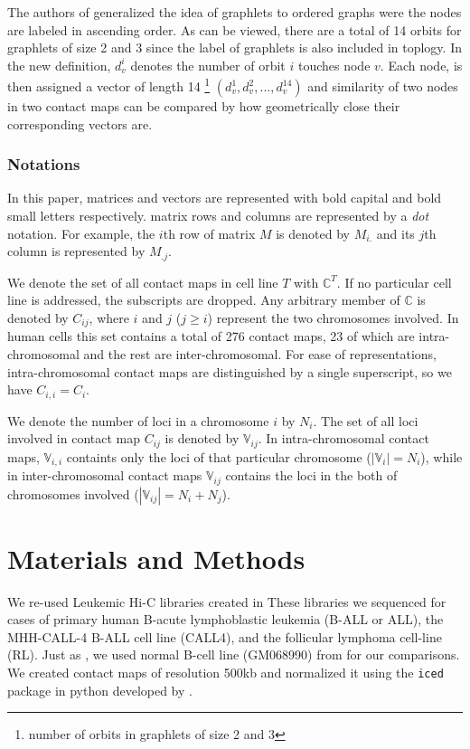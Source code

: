 \documentclass[a4,center,fleqn]{NAR}
\begin{document}
The authors of \cite{di2010fast} generalized the idea of graphlets to 
ordered graphs were the nodes are labeled in ascending order.
As can be viewed, there are a total of 14 orbits for graphlets of size
2 and 3 since the label of graphlets is also included in toplogy.
In the new definition, $d_v^i$ denotes the number of orbit $i$ touches 
node $v$. Each node, is then assigned a vector of length 14 
\footnote{number of orbits in graphlets of size 2 and 3}
$(d_v^1, d_v^2, ..., d_v^{14})$ 
and similarity of two nodes in two contact maps can be compared by
how geometrically close their corresponding vectors are.

\subsubsection{Notations}
In this paper, matrices and vectors are represented with bold
capital and bold small letters respectively.
matrix rows and columns are represented by a \textit{dot}
notation. For example, the $i$th row of matrix $M$ is
denoted by $M_{i.}$ and its $j$th column is represented
by $M_{.j}$.

We denote the set of all contact maps in cell line $T$ with 
$\mathbb{C}^T$. If no particular cell line is addressed, the
subscripts are dropped.
Any arbitrary member of $\mathbb{C}$ is denoted by 
$C_{ij}$, where $i$ and $j$ ($j \ge i$) represent the two chromosomes involved. 
In human cells this set contains a total of 276 contact maps,
23 of which are intra-chromosomal and the rest are inter-chromosomal.
For ease of representations, intra-chromosomal contact maps are
distinguished by a single superscript, so we have $C_{i,i} =
C_i$.

We denote the number of loci in a chromosome $i$ by $N_i$.
The set of all loci involved in contact map $C_{ij}$ is denoted 
by $\mathbb{V}_{ij}$.
In intra-chromosomal contact maps, $\mathbb{V}_{i,i}$ containts only the 
loci of that particular chromosome ($|\mathbb{V}_i| = N_i$), while in 
inter-chromosomal contact maps $\mathbb{V}_{ij}$ contains the loci in
the both of chromosomes involved ($|\mathbb{V}_{ij}| = N_i + N_j$).

\enlargethispage{-65.1pt}

\section{Materials and Methods}
We re-used Leukemic Hi-C libraries 
created in \cite{wang2013properties}
These libraries we sequenced 
for cases of primary human B-acute
lymphoblastic leukemia (B-ALL or ALL), 
the MHH-CALL-4 B-ALL cell
line (CALL4), 
and the follicular lymphoma cell-line (RL).
Just as \cite{wang2013properties}, 
we used normal B-cell line (GM068990)
from \cite{lieberman2009comprehensive} 
for our comparisons.
We created contact maps of resolution
500kb and normalized it using 
the \texttt{iced} package in python
developed by \cite{servant2015hic}.
\end{document}

